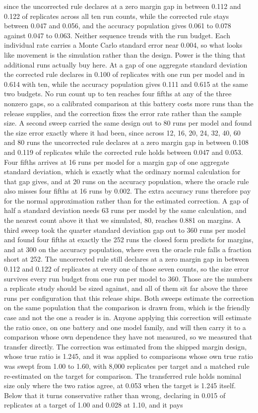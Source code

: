 since the uncorrected rule declares at a zero margin gap in between 0.112 and 0.122 of replicates across all ten run counts, while the corrected rule stays between 0.047 and 0.056, and the accuracy population gives 0.061 to 0.078 against 0.047 to 0.063. Neither sequence trends with the run budget. Each individual rate carries a Monte Carlo standard error near 0.004, so what looks like movement is the simulation rather than the design. Power is the thing that additional runs actually buy here. At a gap of one aggregate standard deviation the corrected rule declares in 0.100 of replicates with one run per model and in 0.614 with ten, while the accuracy population gives 0.111 and 0.615 at the same two budgets. No run count up to ten reaches four fifths at any of the three nonzero gaps, so a calibrated comparison at this battery costs more runs than the release supplies, and the correction fixes the error rate rather than the sample size. A second sweep carried the same design out to 80 runs per model and found the size error exactly where it had been, since across 12, 16, 20, 24, 32, 40, 60 and 80 runs the uncorrected rule declares at a zero margin gap in between 0.108 and 0.119 of replicates while the corrected rule holds between 0.047 and 0.053. Four fifths arrives at 16 runs per model for a margin gap of one aggregate standard deviation, which is exactly what the ordinary normal calculation for that gap gives, and at 20 runs on the accuracy population, where the oracle rule also misses four fifths at 16 runs by 0.002. The extra accuracy runs therefore pay for the normal approximation rather than for the estimated correction. A gap of half a standard deviation needs 63 runs per model by the same calculation, and the nearest count above it that we simulated, 80, reaches 0.881 on margins. A third sweep took the quarter standard deviation gap out to 360 runs per model and found four fifths at exactly the 252 runs the closed form predicts for margins, and at 300 on the accuracy population, where even the oracle rule falls a fraction short at 252. The uncorrected rule still declares at a zero margin gap in between 0.112 and 0.122 of replicates at every one of those seven counts, so the size error survives every run budget from one run per model to 360. Those are the numbers a replicate study should be sized against, and all of them sit far above the three runs per configuration that this release ships. Both sweeps estimate the correction on the same population that the comparison is drawn from, which is the friendly case and not the one a reader is in. Anyone applying this correction will estimate the ratio once, on one battery and one model family, and will then carry it to a comparison whose own dependence they have not measured, so we measured that transfer directly. The correction was estimated from the shipped margin design, whose true ratio is 1.245, and it was applied to comparisons whose own true ratio was swept from 1.00 to 1.60, with 8,000 replicates per target and a matched rule re-estimated on the target for comparison. The transferred rule holds nominal size only where the two ratios agree, at 0.053 when the target is 1.245 itself. Below that it turns conservative rather than wrong, declaring in 0.015 of replicates at a target of 1.00 and 0.028 at 1.10, and it pays 